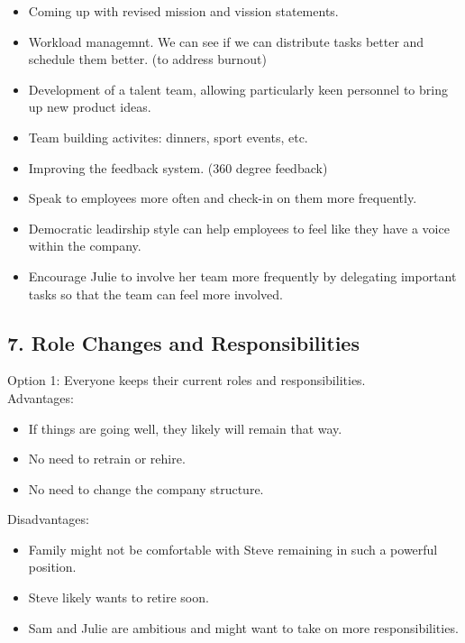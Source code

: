 \documentclass[a4paper,10pt]{article}
\begin{document}
\begin{itemize}
    \item Coming up with revised mission and vission statements.
    \item Workload managemnt. We can see if we can distribute tasks better and schedule them better. (to address burnout)
    \item Development of a talent team, allowing particularly keen personnel to bring up new product ideas.
    \item Team building activites: dinners, sport events, etc.
    \item Improving the feedback system. (360 degree feedback)
    \item Speak to employees more often and check-in on them more frequently.
    \item Democratic leadirship style can help employees to feel like they have a voice within the company.
    \item Encourage Julie to involve her team more frequently by delegating important tasks so that the team can feel more involved.
\end{itemize}

\subsection{7. Role Changes and Responsibilities}

Option 1: Everyone keeps their current roles and responsibilities.\\

Advantages:\\
\begin{itemize}
    \item If things are going well, they likely will remain that way.
    \item No need to retrain or rehire.
    \item No need to change the company structure.
\end{itemize}

Disadvantages:\\
\begin{itemize}
    \item Family might not be comfortable with Steve remaining in such a powerful position.
    \item Steve likely wants to retire soon.
    \item Sam and Julie are ambitious and might want to take on more responsibilities.
\end{itemize}
\end{document}
